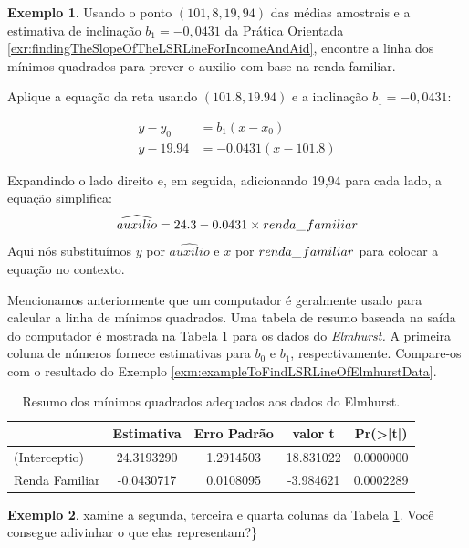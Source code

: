 \documentclass[
]{book}
\theoremstyle{definition}
\theoremstyle{definition}
\newtheorem{example}{Exemplo}[chapter]
\theoremstyle{definition}
\theoremstyle{definition}
\theoremstyle{remark}
\begin{document}
\begin{example}
\protect\hypertarget{exm:exampleToFindLSRLineOfElmhurstData}{}{\label{exm:exampleToFindLSRLineOfElmhurstData} }Usando o ponto \((101,8, 19,94)\) das médias amostrais e a estimativa de inclinação \(b_1 = -0,0431\) da Prática Orientada \ref{exr:findingTheSlopeOfTheLSRLineForIncomeAndAid}, encontre a linha dos mínimos quadrados para prever o auxilio com base na renda familiar.
\end{example}

Aplique a equação da reta usando \((101.8, 19.94)\) e a inclinação \(b_1 = -0,0431\):

\begin{align*}
y - y_0     &= b_1 (x - x_0) \\
y - 19.94  &= -0.0431(x - 101.8)
\end{align*}

Expandindo o lado direito e, em seguida, adicionando 19,94 para cada lado, a equação simplifica:
\[\widehat{auxilio} = 24.3 - 0.0431 \times renda\_\hspace{0.3mm}familiar\]
Aqui nós substituímos \(y\) por \(\widehat{auxilio}\) e \(x\) por \(renda\_\hspace{0.3mm}familiar\) para colocar a equação no contexto.

Mencionamos anteriormente que um computador é geralmente usado para calcular a linha de mínimos quadrados. Uma tabela de resumo baseada na saída do computador é mostrada na Tabela \ref{tab:rOutputForIncomeAidLSRLine} para os dados do \emph{Elmhurst.} A primeira coluna de números fornece estimativas para \({b} _0\) e \({b} _1\), respectivamente. Compare-os com o resultado do Exemplo \ref{exm:exampleToFindLSRLineOfElmhurstData}.

\begin{table}

\caption{\label{tab:rOutputForIncomeAidLSRLine}Resumo dos mínimos quadrados adequados aos dados do Elmhurst.}
\centering
\begin{tabular}[t]{l|c|c|c|c}
\hline
  & Estimativa & Erro Padrão & valor t & Pr(>|t|)\\
\hline
(Interceptio) & 24.3193290 & 1.2914503 & 18.831022 & 0.0000000\\
\hline
Renda Familiar & -0.0430717 & 0.0108095 & -3.984621 & 0.0002289\\
\hline
\end{tabular}
\end{table}

\begin{example}
\protect\hypertarget{exm:unnamed-chunk-275}{}{\label{exm:unnamed-chunk-275} }xamine a segunda, terceira e quarta colunas da Tabela \ref{tab:rOutputForIncomeAidLSRLine}. Você consegue adivinhar o que elas representam?\}
\end{example}
\end{document}
